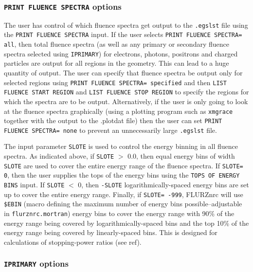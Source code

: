 \documentclass[12pt,twoside]{article}  %
\begin{document}
\subsubsection{{\tt PRINT FLUENCE SPECTRA} options}
\label{flurzprintsect}

The user has control of which fluence spectra get output to the {\tt .egslst}
file using the {\tt PRINT FLUENCE SPECTRA} input.  If the user selects
{\tt PRINT FLUENCE SPECTRA= all}, then total fluence spectra (as well
as any primary or secondary fluence spectra selected using {\tt IPRIMARY})
for electrons,
photons, positrons and charged particles are output for all regions in the
geometry.  This can lead to a huge quantity of output.
The user can specify that fluence spectra be output only for
selected regions using {\tt PRINT FLUENCE SPECTRA= specified} and then
{\tt LIST FLUENCE START REGION} and {\tt LIST FLUENCE STOP REGION} to
specify the regions for which the spectra are to be output.  Alternatively,
if the user is only going to look at the fluence spectra graphically (using a
plotting program such as {\tt xmgrace} together with the output to the .plotdat
file) then the user can set {\tt PRINT FLUENCE SPECTRA= none} to prevent
an unnecessarily large {\tt .egslst} file.

The input parameter {\tt SLOTE} is used to control the energy binning in
all fluence spectra.  As indicated above, if {\tt SLOTE} $>$ 0.0, then
equal energy bins of width {\tt SLOTE} are used to cover the entire energy
range of the fluence spectra.  If {\tt SLOTE= 0}, then the user supplies the
tops of the energy bins using the {\tt TOPS OF ENERGY BINS} input.  If
{\tt SLOTE} $<$ 0, then {\tt -SLOTE} logarithmically-spaced energy bins are
set up to cover the entire energy range.  Finally, if {\tt SLOTE= -999},
FLURZnrc will use {\tt \$EBIN} (macro defining the maximum number of energy
bins possible--adjustable in {\tt flurznrc.mortran}) energy bins to cover the
energy range with 90\% of the energy range being covered by logarithmically-spaced bins and the top 10\% of the energy range being covered by linearly-spaced
bins.  This is designed for calculations of stopping-power ratios (see
ref\cite{Ma91}).

\subsubsection{{\tt IPRIMARY} options}
\label{flurziprimsect}
\end{document}

